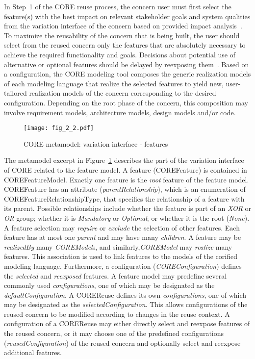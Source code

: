 In Step~1 of the CORE reuse process, the concern user must first select the feature(s) with the best impact on relevant stakeholder goals and system qualities from the variation interface of the concern based on provided impact analysis~\cite{duran2016investigation}. To maximize the reusability of the concern that is being built, the user should select from the reused concern only the features that are absolutely necessary to achieve the required functionality and goals. Decisions about potential use of alternative or optional features should be delayed by reexposing them~\cite{kienzle2016delaying}. Based on a configuration, the CORE modeling tool composes the generic realization models of each modeling language that realize the selected features to yield new, user-tailored realization models of the concern corresponding to the desired configuration. Depending on the root phase of the concern, this composition may involve requirement models, architecture models, design models and/or code.

\begin{figure}
	\centering
	\texttt{[image: fig\_2\_2.pdf]}
	\caption{CORE metamodel: variation interface - features}
	\label{fig:2.2}
\end{figure}

The metamodel excerpt in Figure~\ref{fig:2.2} describes the part of the variation interface of CORE related to the feature model. A feature ({\cls COREFeature}) is contained in {\cls COREFeatureModel}. Exactly one feature is the \emph{root} feature of the feature model. {\cls COREFeature} has an attribute (\emph{parentRelationship}), which is an enumeration of {\cls COREFeatureRelationshipType}, that specifies the relationship of a feature with its parent. Possible relationships include whether the feature is part of an \emph{XOR} or \emph{OR} group; whether it is \emph{Mandatory} or \emph{Optional}; or whether it is the root (\emph{None}). A feature selection may \emph{require} or \emph{exclude} the selection of other features. Each feature has at most one \emph{parent} and may have many \emph{children}. A feature may be \emph{realizedBy} many \textit{\cls COREModel}s, and similarly,\textit{\cls COREModel} may \emph{realize} many features. This association is used to link features to the models of the corified modeling language. Furthermore, a configuration (\textit{\cls COREConfiguration}) defines the \emph{selected} and \emph{reexposed} features. A feature model may predefine several commonly used \emph{configurations}, one of which may be designated as the \emph{defaultConfiguration}. A {\cls COREReuse} defines its own \emph{configurations}, one of which may be designated as the \emph{selectedConfiguration}. This allows configurations of the reused concern to be modified according to changes in the reuse context. A configuration of a {\cls COREReuse} may either directly select and reexpose features of the reused concern, or it may choose one of the predefined configurations (\emph{reusedConfiguration}) of the reused concern and optionally select and reexpose additional features.

